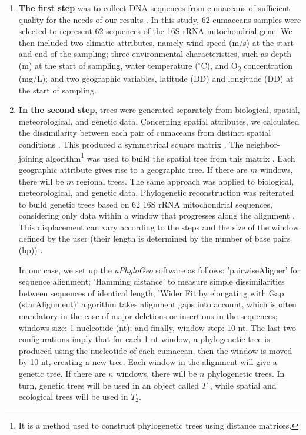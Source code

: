 \begin{enumerate}
\item \textbf{The first step} was to collect DNA sequences from cumaceans of sufficient quality for the needs of our results \citep{koshkarov_phylogeography_2022}. In this study, 62 cumaceans samples were selected to represent 62 sequences of the 16S rRNA mitochondrial gene. We then included two climatic attributes, namely wind speed (m/s) at the start and end of the sampling; three environmental characteristics, such as depth (m) at the start of sampling, water temperature ($^\circ$C), and O\textsubscript{2} concentration (mg/L); and two geographic variables, latitude (DD) and longitude (DD) at the start of sampling.

\item \textbf{In the second step}, trees were generated separately from biological, spatial, meteorological, and genetic data. Concerning spatial attributes, we calculated the dissimilarity between each pair of cumaceans from distinct spatial conditions \citep{koshkarov_phylogeography_2022}. This produced a symmetrical square matrix \citep{koshkarov_phylogeography_2022}. The {neighbor-joining algorithm}\footnote{It is a method used to construct phylogenetic trees using distance matrices.} was used to build the spatial tree from this matrix \citep{koshkarov_phylogeography_2022}. Each geographic attribute gives rise to a geographic tree. If there are $m$ windows, there will be $m$ regional trees. The same approach was applied to biological, meteorological, and genetic data. Phylogenetic reconstruction was reiterated to build genetic trees based on 62 16S rRNA mitochondrial sequences, considering only data within a window that progresses along the alignment \citep{koshkarov_phylogeography_2022}. This displacement can vary according to the steps and the size of the window defined by the user (their length is determined by the number of base pairs (bp)) \citep{koshkarov_phylogeography_2022}. 

In our case, we set up the \textit{aPhyloGeo} software as follows: 'pairwiseAligner' for sequence alignment; 'Hamming distance' to measure simple dissimilarities between sequences of identical length; 'Wider Fit by elongating with Gap (starAlignment)' algorithm takes alignment gaps into account, which is often mandatory in the case of major deletions or insertions in the sequences; windows size: 1 nucleotide (nt); and finally, window step: 10 nt. The last two configurations imply that for each 1 nt window, a phylogenetic tree is produced using the nucleotide of each cumacean, then the window is moved by 10 nt, creating a new tree. Each window in the alignment will give a genetic tree. If there are $n$ windows, there will be $n$ phylogenetic trees. In turn, genetic trees will be used in an object called $T_1$, while spatial and ecological trees will be used in $T_2$.


\end{enumerate}
